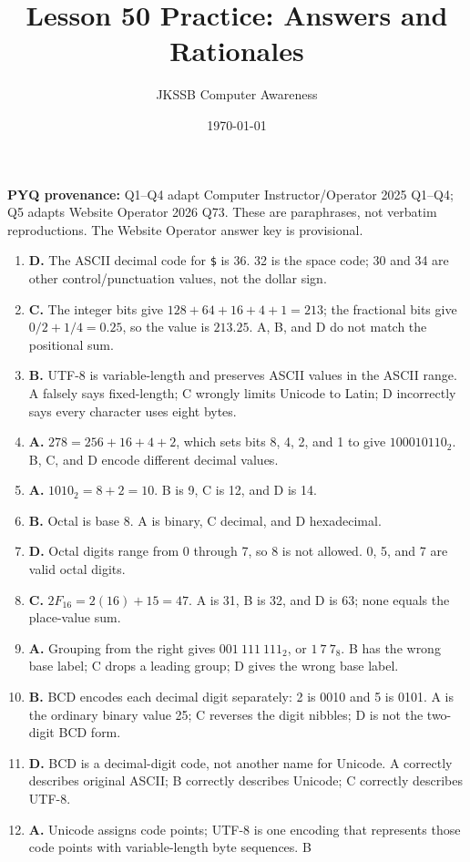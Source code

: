 \documentclass[11pt]{article}
\title{Lesson 50 Practice: Answers and Rationales}
\author{JKSSB Computer Awareness}
\date{\today}
\begin{document}
\maketitle
\noindent\textbf{PYQ provenance:} Q1--Q4 adapt Computer
Instructor/Operator 2025 Q1--Q4; Q5 adapts Website Operator 2026 Q73.
These are paraphrases, not verbatim reproductions. The Website Operator
answer key is provisional.
\begin{enumerate}
\item \textbf{D.} The ASCII decimal code for \texttt{\$} is 36. 32 is the
  space code; 30 and 34 are other control/punctuation values, not the dollar
  sign.
\item \textbf{C.} The integer bits give $128+64+16+4+1=213$; the fractional
  bits give $0/2+1/4=0.25$, so the value is $213.25$. A, B, and D do not
  match the positional sum.
\item \textbf{B.} UTF-8 is variable-length and preserves ASCII values in the
  ASCII range. A falsely says fixed-length; C wrongly limits Unicode to
  Latin; D incorrectly says every character uses eight bytes.
\item \textbf{A.} $278=256+16+4+2$, which sets bits 8, 4, 2, and 1 to give
  $100010110_2$. B, C, and D encode different decimal values.
\item \textbf{A.} $1010_2=8+2=10$. B is 9, C is 12, and D is 14.
\item \textbf{B.} Octal is base 8. A is binary, C decimal, and D hexadecimal.
\item \textbf{D.} Octal digits range from 0 through 7, so 8 is not allowed.
  0, 5, and 7 are valid octal digits.
\item \textbf{C.} $2F_{16}=2(16)+15=47$. A is 31, B is 32, and D is 63;
  none equals the place-value sum.
\item \textbf{A.} Grouping from the right gives $001\ 111\ 111_2$, or
  $1\ 7\ 7_8$. B has the wrong base label; C drops a leading group; D gives
  the wrong base label.
\item \textbf{B.} BCD encodes each decimal digit separately: 2 is 0010 and
  5 is 0101. A is the ordinary binary value 25; C reverses the digit
  nibbles; D is not the two-digit BCD form.
\item \textbf{D.} BCD is a decimal-digit code, not another name for Unicode.
  A correctly describes original ASCII; B correctly describes Unicode; C
  correctly describes UTF-8.
\item \textbf{A.} Unicode assigns code points; UTF-8 is one encoding that
  represents those code points with variable-length byte sequences. B

\end{enumerate}
\end{document}
